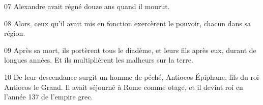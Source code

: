 
07 Alexandre avait régné douze ans quand il mourut.

08 Alors, ceux qu’il avait mis en fonction exercèrent le pouvoir, chacun dans sa région.

09 Après sa mort, ils portèrent tous le diadème, et leurs fils après eux, durant de longues années. Et ils multiplièrent les malheurs sur la terre.

10 De leur descendance surgit un homme de péché, Antiocos Épiphane, fils du roi Antiocos le Grand. Il avait séjourné à Rome comme otage, et il devint roi en l’année 137 de l’empire grec.

